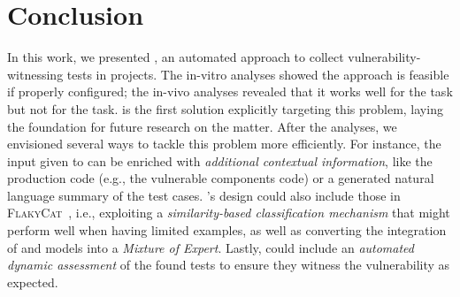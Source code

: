 \section{Conclusion}
\label{sec:conclusion}

In this work, we presented \vuteco, an automated approach to collect vulnerability-witnessing tests in \Java projects.
The in-vitro analyses showed the \vuteco approach is feasible if properly configured; the in-vivo analyses revealed that it works well for the \finding task but not for the \matching task.
%
\vuteco is the first solution explicitly targeting this problem, laying the foundation for future research on the matter.
After the analyses, we envisioned several ways to tackle this problem more efficiently.
For instance, the input given to \vuteco can be enriched with \textit{additional contextual information}, like the production code (e.g., the vulnerable components code) or a generated natural language summary of the test cases.
\vuteco's design could also include those in \textsc{FlakyCat}~\cite{akli:ast2023:flakycat}, i.e., exploiting a \textit{similarity-based classification mechanism} that might perform well when having limited examples, as well as converting the integration of \finder and \linker models into a \textit{Mixture of Expert}.
Lastly, \vuteco could include an \textit{automated dynamic assessment} of the found tests to ensure they witness the vulnerability as expected.
